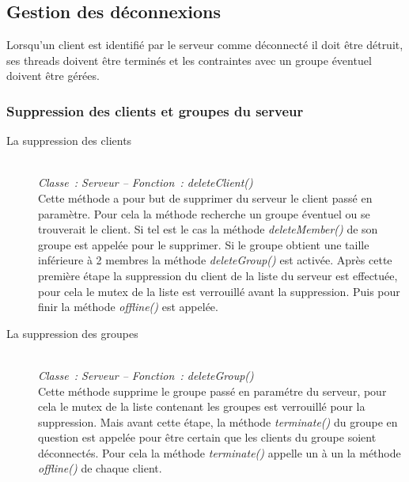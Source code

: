 \documentclass[a4paper, titlepage]{livret}
\begin{document}
\subsection{Gestion des déconnexions}
  Lorsqu’un client est identifié par le serveur comme déconnecté il doit être détruit, ses threads doivent être terminés et les contraintes avec un groupe éventuel doivent être gérées.

\subsubsection{Suppression des clients et groupes du serveur}

\begin{description}
  \item[La suppression des clients]
  \textit{\\Classe : Serveur – Fonction : deleteClient()\\}
    Cette méthode a pour but de supprimer du serveur le client passé en paramètre. Pour cela la méthode recherche un groupe éventuel ou se trouverait le client. Si tel est le cas la méthode \textit{deleteMember()} de son groupe est appelée pour le supprimer. Si le groupe obtient une taille inférieure à 2 membres la méthode  \textit{deleteGroup()} est activée.
Après cette première étape la suppression du client de la liste du serveur est effectuée, pour cela le mutex de la liste est verrouillé avant la suppression. Puis pour finir la méthode \textit{offline()} est appelée.
   
   \item[La suppression des groupes]
   \textit{\\Classe : Serveur – Fonction : deleteGroup()\\}
   Cette méthode supprime le groupe passé en paramétre du serveur, pour cela le mutex de la liste contenant les groupes est verrouillé pour la suppression. Mais avant cette étape, la méthode \textit{terminate()} du groupe en question est appelée pour être certain que les clients du groupe soient déconnectés. Pour cela la méthode \textit{terminate()} appelle un à un la méthode \textit{offline()} de chaque client.
\end{description}
\end{document}
